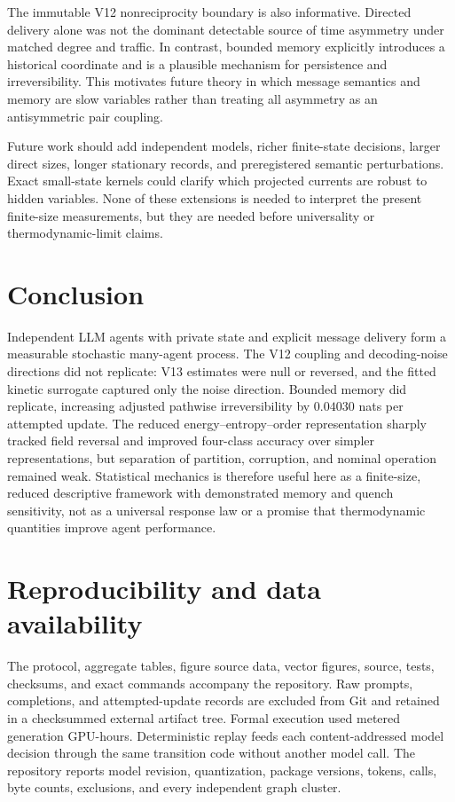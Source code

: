 \documentclass[12pt]{article}
\begin{document}
The immutable V12 nonreciprocity boundary is also informative. Directed
delivery alone was not the dominant detectable source of time asymmetry under
matched degree and traffic. In contrast, bounded memory explicitly introduces
a historical coordinate and is a plausible mechanism for persistence and
irreversibility. This motivates future theory in which message semantics and
memory are slow variables rather than treating all asymmetry as an
antisymmetric pair coupling.

Future work should add independent models, richer finite-state decisions,
larger direct sizes, longer stationary records, and preregistered semantic
perturbations. Exact small-state kernels could clarify which projected currents
are robust to hidden variables. None of these extensions is needed to interpret
the present finite-size measurements, but they are needed before universality or
thermodynamic-limit claims.

\section{Conclusion}

Independent LLM agents with private state and explicit message delivery form a
measurable stochastic many-agent process. The V12 coupling and decoding-noise
directions did not replicate: V13 estimates were null or reversed, and the
fitted kinetic surrogate captured only the noise direction. Bounded memory did
replicate, increasing adjusted pathwise irreversibility by $0.04030$ nats per
attempted update. The reduced energy--entropy--order representation sharply
tracked field reversal and improved four-class accuracy over simpler
representations, but separation of partition, corruption, and nominal operation
remained weak. Statistical mechanics is therefore useful here as a finite-size,
reduced descriptive framework with demonstrated memory and quench sensitivity,
not as a universal response law or a promise that thermodynamic quantities
improve agent performance.

\section*{Reproducibility and data availability}

The protocol, aggregate tables, figure source data, vector figures, source,
tests, checksums, and exact commands accompany the repository. Raw prompts,
completions, and attempted-update records are excluded from Git and retained in
a checksummed external artifact tree. Formal execution used
\VThirteenGPUHours{} metered generation GPU-hours. Deterministic replay feeds
each content-addressed model decision through the same transition code without
another model call. The repository reports model revision, quantization,
package versions, tokens, calls, byte counts, exclusions, and every independent
graph cluster.
\end{document}
